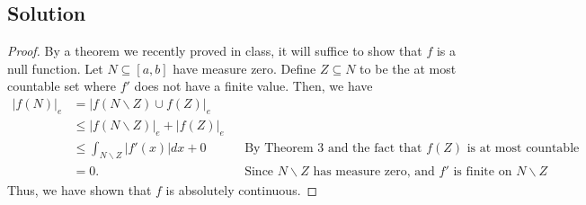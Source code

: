 \documentclass[10pt,a4paper]{article}
\theoremstyle{theorem}
\theoremstyle{definition}
\begin{document}
\subsection*{Solution}
\begin{proof}
By a theorem we recently proved in class, it will suffice to show that $f$ is a null function. Let $N \subseteq [a, b]$ have measure zero. Define $Z \subseteq N$ to be the at most countable set where $f'$ does not have a finite value. Then, we have
\begin{align*}
|f(N)|_e &= |f(N\backslash Z) \cup f(Z)|_e\\
&\leq |f(N\backslash Z)|_e + |f(Z)|_e\\
&\leq \int_{N\backslash Z} |f'(x)|dx + 0 && \text{By Theorem 3 and the fact that } f(Z) \text{ is at most countable}\\
&= 0. &&\text{Since } N\backslash Z \text{ has measure zero, and } f' \text{ is finite on } N\backslash Z
\end{align*}
Thus, we have shown that $f$ is absolutely continuous.
\end{proof}
\end{document}
